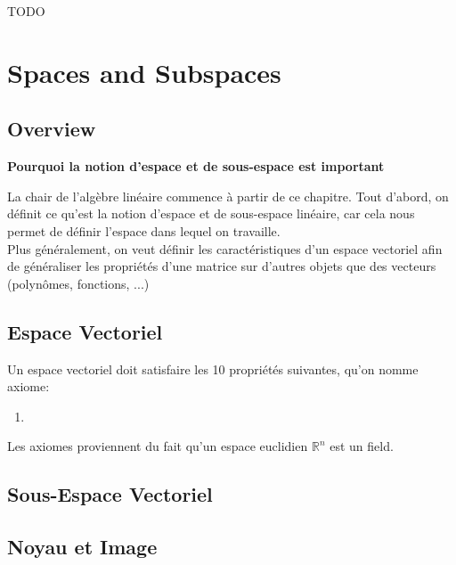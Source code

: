 \documentclass{article}
\begin{document}
TODO

\section{Spaces and Subspaces}

\subsection{Overview}%
\label{sub:Overview}

\textbf{Pourquoi la notion d'espace et de sous-espace est important}

La chair de l'algèbre linéaire commence à partir de ce chapitre. Tout
d'abord, on définit ce qu'est la notion d'espace et de sous-espace
linéaire, car cela nous permet de définir l'espace dans lequel on travaille.\\

Plus généralement, on veut définir les caractéristiques d'un espace vectoriel
afin de généraliser les propriétés d'une matrice sur d'autres objets que
des vecteurs (polynômes, fonctions, ...)

\subsection{Espace Vectoriel}%
\label{sub:Espace Vectoriel}

\begin{definition}
    Un espace vectoriel doit satisfaire les 10 propriétés suivantes, qu'on
    nomme axiome:
    \begin{enumerate}
	\item
    \end{enumerate}
\end{definition}

\begin{remark}
    Les axiomes proviennent du fait qu'un espace euclidien $\mathbb{R}^n$
    est un field.
\end{remark}

\subsection{Sous-Espace Vectoriel}%
\label{sub:Sous-Espace Vectoriel}

\begin{definition}
\end{definition}

\subsection{Noyau et Image}%
\label{sub:Noyau et Image}
\end{document}
